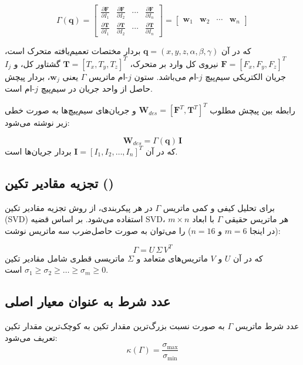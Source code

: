 \[
\Gamma(\mathbf{q}) = 
\begin{bmatrix}
	\frac{\partial \mathbf{F}}{\partial I_1} & \frac{\partial \mathbf{F}}{\partial I_2} & \cdots & \frac{\partial \mathbf{F}}{\partial I_n} \\[4pt]
	\frac{\partial \mathbf{T}}{\partial I_1} & \frac{\partial \mathbf{T}}{\partial I_2} & \cdots & \frac{\partial \mathbf{T}}{\partial I_n}
\end{bmatrix}
=
\begin{bmatrix}
	\mathbf{w}_1 & \mathbf{w}_2 & \cdots & \mathbf{w}_n
\end{bmatrix}
\]

که در آن $\mathbf{q} = (x,y,z,\alpha,\beta,\gamma)$ بردار مختصات تعمیم‌یافته متحرک است، $\mathbf{F} = [F_x,F_y,F_z]^T$ نیروی کل وارد بر متحرک، $\mathbf{T} = [T_x,T_y,T_z]^T$ گشتاور کل، و $I_j$ جریان الکتریکی سیم‌پیچ $j$-ام می‌باشد. ستون $j$-ام ماتریس $\Gamma$ یعنی $\mathbf{w}_j$، بردار پیچش حاصل از واحد جریان در سیم‌پیچ $j$-ام است.

رابطه بین پیچش مطلوب $\mathbf{W}_{des} = [\mathbf{F}^T, \mathbf{T}^T]^T$ و جریان‌های سیم‌پیچ‌ها به صورت خطی زیر نوشته می‌شود:

\[
\mathbf{W}_{des} = \Gamma(\mathbf{q}) \, \mathbf{I}
\]
\label{eq:method-wrench-des}
که در آن $\mathbf{I} = [I_1,I_2,\dots,I_n]^T$ بردار جریان‌ها است.

\subsection{تجزیه مقادیر تکین ()}
\label{subsec:method-svd-analysis}

برای تحلیل کیفی و کمی ماتریس $\Gamma$ در هر پیکربندی، از روش تجزیه مقادیر تکین (SVD) استفاده می‌شود. بر اساس قضیه SVD، هر ماتریس حقیقی $\Gamma$ با ابعاد $m \times n$ (در اینجا $m=6$ و $n=16$) را می‌توان به صورت حاصل‌ضرب سه ماتریس نوشت:

\[
\Gamma = U \, \Sigma \, V^T
\]
\label{eq:method-svd-gamma}
که در آن $U$ و $V$ ماتریس‌های متعامد و $\Sigma$ ماتریسی قطری شامل مقادیر تکین $\sigma_1 \ge \sigma_2 \ge \dots \ge \sigma_m \ge 0$ است.

\subsection{عدد شرط به عنوان معیار اصلی}
\label{subsec:method-condition-number}

عدد شرط ماتریس $\Gamma$ به صورت نسبت بزرگ‌ترین مقدار تکین به کوچک‌ترین مقدار تکین تعریف می‌شود:
\[
\kappa(\Gamma) = \frac{\sigma_{\max}}{\sigma_{\min}}
\]
\label{eq:method-condition-number}

